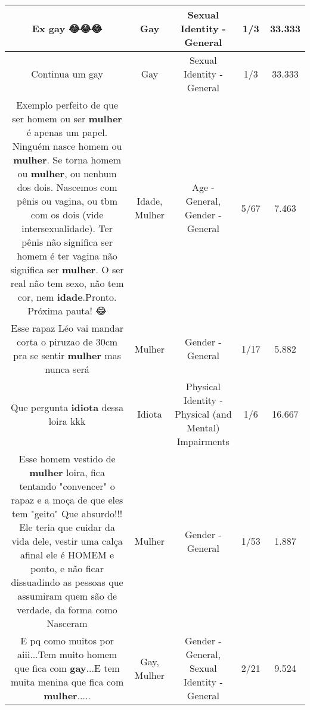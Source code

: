 \documentclass[11pt]{article}
\newlength\mylength
\begin{document}
\begin{center}
\begin{longtable}{|C{.65\mylength}|C{.30\mylength}|C{.12\mylength}|C{.12\mylength}|C{.12\mylength}|}
  \small Ex \textbf{gay} 😂😂😂\normalsize   & Gay & Sexual Identity - General & 1/3 & 33.333 \\  \hline
  \small Continua um gay\normalsize   & Gay & Sexual Identity - General & 1/3 & 33.333 \\  \hline
  \small Exemplo perfeito de que ser homem ou ser \textbf{mulher} é apenas um papel. Ninguém nasce homem ou \textbf{mulher}. Se torna homem ou \textbf{mulher}, ou nenhum dos dois. Nascemos com pênis ou vagina, ou tbm com os dois (vide intersexualidade). Ter pênis não significa ser homem é ter vagina não significa ser \textbf{mulher}. O ser real não tem sexo, não tem cor, nem \textbf{idade}.Pronto. Próxima pauta! 😂\normalsize   & Idade, Mulher & Age - General, Gender - General & 5/67 & 7.463 \\  \hline
  \small Esse rapaz Léo vai mandar corta o piruzao de 30cm pra se sentir \textbf{mulher} mas nunca será\normalsize   & Mulher & Gender - General & 1/17 & 5.882 \\  \hline
  \small Que pergunta \textbf{idiota} dessa loira kkk\normalsize   & Idiota & Physical Identity - Physical (and Mental) Impairments & 1/6 & 16.667 \\  \hline
  \small Esse homem vestido de \textbf{mulher} loira, fica tentando  "convencer" o rapaz e a moça de que eles tem "geito" Que absurdo!!! Ele teria que cuidar da vida dele, vestir uma calça afinal ele é HOMEM e ponto, e não ficar dissuadindo as pessoas que assumiram quem são de verdade, da forma como Nasceram\normalsize   & Mulher & Gender - General & 1/53 & 1.887 \\  \hline
  \small E pq como muitos por aiii...Tem muito homem que fica com \textbf{gay}...E tem muita menina que fica com \textbf{mulher}.....\normalsize   & Gay, Mulher & Gender - General, Sexual Identity - General & 2/21 & 9.524 \\  \hline

\end{longtable}
\end{center}
\end{document}
